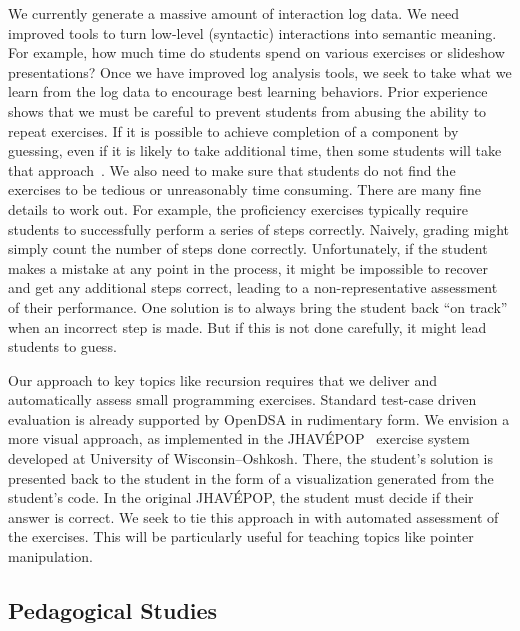 \documentclass[11pt]{article}
\begin{document}
We currently generate a massive amount of interaction log data.
We need improved tools to turn low-level (syntactic) interactions into
semantic meaning.
For example, how much time do students spend on
various exercises or slideshow presentations?
Once we have improved log analysis tools, we seek to
take what we learn from the log data to encourage best
learning behaviors.
Prior experience shows that we must be careful to prevent students from
abusing the ability to repeat exercises.
If it is possible to achieve completion of a component by guessing,
even if it is likely to take additional time, then
some students will take that approach~\cite{Karavirta2005}.
We also need to make sure that students do not find the
exercises to be tedious or unreasonably time consuming.
There are many fine details to work out.
For example, the proficiency exercises typically require students to
successfully perform a series of steps correctly.
Naively, grading might simply count the number of steps done
correctly.
Unfortunately, if the student makes a mistake at any point in the
process, it might be impossible to recover and get any additional
steps correct, leading to a non-representative assessment of their
performance.
One solution is to always bring the student back ``on track'' when an
incorrect step is made.
But if this is not done carefully, it might lead students to guess.

Our approach to key topics like recursion requires that we
deliver and automatically assess small programming exercises.
Standard test-case driven evaluation is already supported by OpenDSA
in rudimentary form.
We envision a more visual approach, as implemented in the
JHAV\'{E}POP~\cite{JHAVEPOP} exercise system developed at University of
Wisconsin--Oshkosh.
There, the student's solution is presented back to the student
in the form of a visualization generated from the student's code.
In the original JHAV\'{E}POP, the student must decide if their answer
is correct.
We seek to tie this approach in with automated assessment of the
exercises.
This will be particularly useful for teaching topics like pointer
manipulation.

\subsection{Pedagogical Studies}
\end{document}

